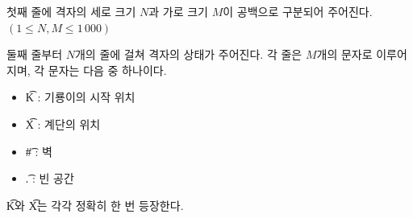 첫째 줄에 격자의 세로 크기 $N$과 가로 크기 $M$이 공백으로 구분되어 주어진다. $(1 \leq N, M \leq 1\,000)$

둘째 줄부터 $N$개의 줄에 걸쳐 격자의 상태가 주어진다. 
각 줄은 $M$개의 문자로 이루어지며, 각 문자는 다음 중 하나이다.

\begin{itemize}
\item \t{K} : 기룡이의 시작 위치
\item \t{X} : 계단의 위치
\item \t{\#} : 벽
\item \t{.} : 빈 공간
\end{itemize}

\t{K}와 \t{X}는 각각 정확히 한 번 등장한다.